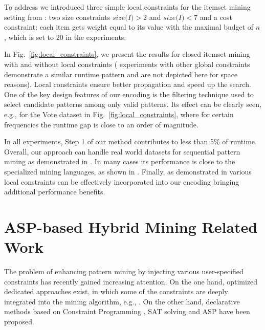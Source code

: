 {To %
address \qthree we introduced three simple local constraints %
for the itemset mining setting from \qtwo: %
two size constraints $\textit{size(I)} > 2$ and $\textit{size(I)} < 7$ and a cost constraint: each item gets weight equal to its value with the maximal budget of $n$, which is set to $20$ in the experiments. %

In Fig.~\ref{fig:local_constraints}, we present the results for closed itemset mining with and without local constraints (%
experiments with other global constraints demonstrate a similar runtime pattern and are not depicted here for space reasons). %
Local constraints ensure %
better propagation and speed up the search. One of the key design features of our encoding is the filtering technique used to select candidate patterns among only valid patterns. Its effect can be clearly seen, e.g., for the Vote dataset in Fig.~\ref{fig:local_constraints}, where for certain frequencies the runtime gap is close to an order of magnitude.

In all experiments, Step 1 of our method contributes to less than 5\% of runtime. Overall, our approach can handle real world datasets for sequential pattern mining as demonstrated in \qone. In many cases %
its performance is %
close to the specialized mining languages, as %
shown in \qtwo. Finally, as demonstrated in \qthree various local constraints can be effectively incorporated into our encoding
bringing additional performance benefits. %

\section{ASP-based Hybrid Mining Related Work}\label{sec:relwork}

The problem of enhancing pattern mining by injecting various user-specified constraints has recently gained increasing attention. On the one hand, optimized dedicated approaches exist, in which some of the constraints are deeply integrated into the mining algorithm, e.g., \parencite{DBLP:conf/kdd/PeiH00}.  On the other hand, %
declarative methods based on Constraint Programming \parencite{sky2014,DBLP:conf/cpaior/NegrevergneG15,DBLP:journals/corr/MetivierLC13}, SAT solving \parencite{DBLP:conf/pakdd/JabbourSS15,DBLP:conf/cikm/JabbourSS13} and ASP \parencite{DBLP:conf/lpnmr/Jarvisalo11,DBLP:conf/ijcai/GebserGQ0S16,DBLP:journals/corr/GuyetMQ14} have been proposed. 

}
